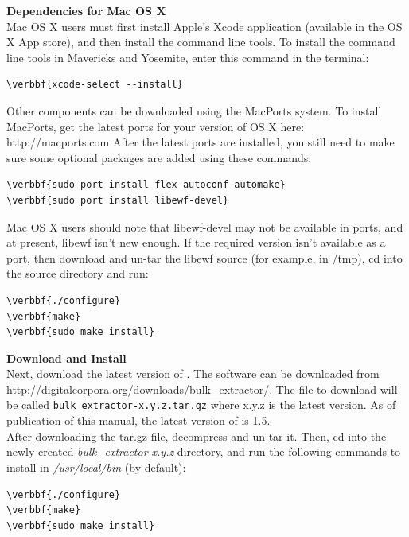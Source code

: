 \documentclass[11pt]{article} %
\begin{document}
\textbf{Dependencies for Mac OS X}\\
Mac OS X users must first install Apple's Xcode application (available in the OS X App store), and then install the command line tools. 
To install the command line tools in Mavericks and Yosemite, enter this command in the terminal:
\begin{Verbatim}[commandchars=\\\{\}]
\verbbf{xcode-select --install}
\end{Verbatim}

Other components can be downloaded using the MacPorts system. To install MacPorts, get the latest ports for your version of OS X here:
http://macports.com
After the latest ports are installed, you still need to make sure some optional packages are added using these commands:

\begin{Verbatim}[commandchars=\\\{\}]
\verbbf{sudo port install flex autoconf automake}
\verbbf{sudo port install libewf-devel}
\end{Verbatim}

Mac OS X users should note that libewf-devel may not be available in ports, and at present, libewf isn't new enough.  If the required version isn't available as a port, then download and un-tar the libewf source (for example, in /tmp), cd into the source directory and run:
\begin{Verbatim}[commandchars=\\\{\}]
\verbbf{./configure} 
\verbbf{make}
\verbbf{sudo make install}
\end{Verbatim}

\textbf{Download and Install \bulk}\\
Next, download the latest version of \bulk. The software can be downloaded from \url{http://digitalcorpora.org/downloads/bulk_extractor/}. The file to download will be called \texttt{bulk\_extractor-x.y.z.tar.gz} where x.y.z is the latest version. As of publication of this manual, the latest version of \bulk is 1.5. \\

After downloading the tar.gz file, decompress and un-tar it. Then, cd into the newly created \textit{bulk\_extractor-x.y.z} directory, and run the following commands to install \bulk in \textit{/usr/local/bin} (by default):

\begin{Verbatim}[commandchars=\\\{\}]
\verbbf{./configure}
\verbbf{make}
\verbbf{sudo make install}
\end{Verbatim}
\end{document}
